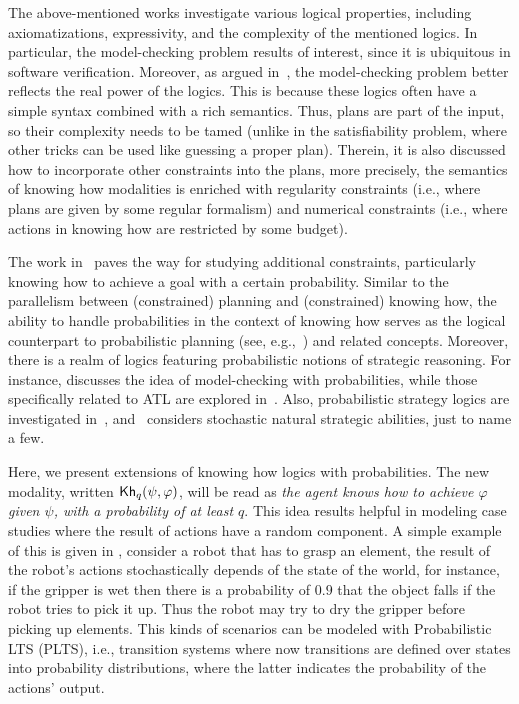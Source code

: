 The above-mentioned works investigate various logical properties, including axiomatizations, expressivity, and the complexity of the mentioned logics. In particular, the model-checking problem results of interest, since it is  ubiquitous in software verification. Moreover, as argued in~\cite{DemriF23}, the model-checking problem better reflects the real power of the logics. This is because these logics often have a simple syntax combined with a rich semantics. Thus, plans are part of the input, so their complexity needs to be tamed (unlike in the satisfiability problem, where other tricks can be used like guessing a proper plan). Therein, it is also discussed how to incorporate other constraints into the plans, more precisely, the semantics of knowing how modalities is enriched with regularity constraints (i.e., where plans are given by some regular formalism) and numerical constraints (i.e., where actions in knowing how are restricted by some budget). 

The work in \cite{DemriF23}~paves the way for studying additional constraints, particularly knowing how to achieve a goal with a certain probability. Similar to the parallelism between (constrained) planning and (constrained) knowing how, the ability to handle probabilities in the context of knowing how serves as the logical counterpart to probabilistic planning (see, e.g.,~\cite{MadaniHC99}) and related concepts. Moreover, there is a realm of logics featuring probabilistic notions of strategic reasoning. For instance, \cite{BaierAFK18} discusses the idea of model-checking with probabilities, while those specifically related to ATL are explored in~\cite{BA95,TJ07,BullingJ09}. Also, probabilistic strategy logics are investigated in~\cite{AKMM19}, and~\cite{BerthonKMM24} considers stochastic natural strategic abilities, just to name a few.

Here, we present extensions of knowing how logics with probabilities. The new modality, written ${\mathsf{Kh}}_q(\psi,\varphi)$, will be read as \emph{the agent knows how to achieve $\varphi$ given $\psi$, with a probability of at least $q$}. This idea results helpful in modeling case studies where the result of actions have a random component. A simple example of this is given in \cite{Kushmerick1995},  consider a robot that has to grasp an element,  the result of the robot's actions stochastically depends of the state of the world, for instance,  if the gripper is wet then there is  a probability of $0.9$ that the object falls if the robot tries to pick it up.  Thus the robot may try to dry the gripper before picking up elements.    This kinds of scenarios can be modeled with Probabilistic LTS (PLTS), i.e., transition systems where now transitions are defined over states into probability distributions, where the latter indicates the probability of the actions' output. 

